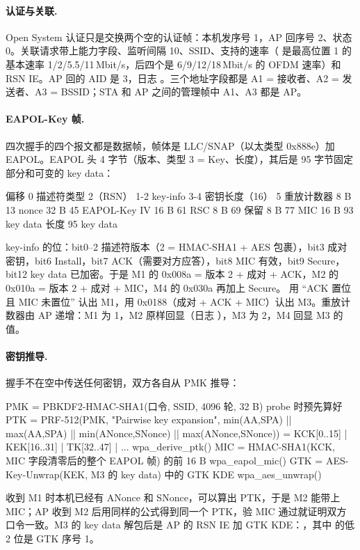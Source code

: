 \paragraph{认证与关联.} Open System 认证只是交换两个空的认证帧：本机发序号 1，AP 回序号 2、状态 0。关联请求带上能力字段、监听间隔 10、SSID、支持的速率（ 是最高位置 1 的基本速率 1/2/5.5/11\,Mbit/s，后四个是 6/9/12/18\,Mbit/s 的 OFDM 速率）和 RSN IE。AP 回的 AID 是 3，日志 。三个地址字段都是 A1 = 接收者、A2 = 发送者、A3 = BSSID；STA 和 AP 之间的管理帧中 A1、A3 都是 AP。

\paragraph{EAPOL-Key 帧.} 四次握手的四个报文都是数据帧，帧体是 LLC/SNAP（以太类型 0x888e）加 EAPOL。EAPOL 头 4 字节（版本、类型 3 = Key、长度），其后是 95 字节固定部分和可变的 key data：
\begin{txtcode}
偏移  0   描述符类型 2（RSN）     1-2  key-info              3-4  密钥长度（16）
      5   重放计数器 8 B           13   nonce 32 B
     45   EAPOL-Key IV 16 B        61   RSC 8 B              69   保留 8 B
     77   MIC 16 B                 93   key data 长度         95   key data
\end{txtcode}
key-info 的位：bit0--2 描述符版本（2 = HMAC-SHA1 + AES 包裹），bit3 成对密钥，bit6 Install，bit7 ACK（需要对方应答），bit8 MIC 有效，bit9 Secure，bit12 key data 已加密。于是 M1 的 0x008a = 版本 2 + 成对 + ACK，M2 的 0x010a = 版本 2 + 成对 + MIC，M4 的 0x030a 再加上 Secure。 用 ``ACK 置位且 MIC 未置位'' 认出 M1，用 0x0188（成对 + ACK + MIC）认出 M3。重放计数器由 AP 递增：M1 为 1，M2 原样回显（日志 ），M3 为 2，M4 回显 M3 的值。

\paragraph{密钥推导.} 握手不在空中传送任何密钥，双方各自从 PMK 推导：
\begin{txtcode}
PMK = PBKDF2-HMAC-SHA1(口令, SSID, 4096 轮, 32 B)                    probe 时预先算好
PTK = PRF-512(PMK, "Pairwise key expansion",
              min(AA,SPA) || max(AA,SPA) || min(ANonce,SNonce) || max(ANonce,SNonce))
    = KCK[0..15] | KEK[16..31] | TK[32..47] | ...                  wpa_derive_ptk()
MIC = HMAC-SHA1(KCK, MIC 字段清零后的整个 EAPOL 帧) 的前 16 B        wpa_eapol_mic()
GTK = AES-Key-Unwrap(KEK, M3 的 key data) 中的 GTK KDE               wpa_aes_unwrap()
\end{txtcode}
收到 M1 时本机已经有 ANonce 和 SNonce，可以算出 PTK，于是 M2 能带上 MIC；AP 收到 M2 后用同样的公式得到同一个 PTK，验 MIC 通过就证明双方口令一致。M3 的 key data 解包后是 AP 的 RSN IE 加 GTK KDE：，其中  的低 2 位是 GTK 序号 1。

